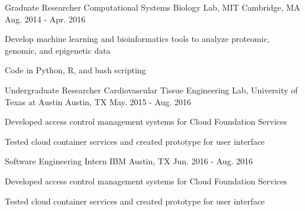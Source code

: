 

\begin{cventries}

\cventry
    {Graduate Researcher} %
    {Computational Systems Biology Lab, MIT} %
    {Cambridge, MA} %
    {Aug. 2014 - Apr. 2016} %
    {
      \begin{cvitems} %
        \item {Develop machine learning  and bioinformatics tools to analyze proteomic, genomic, and epigenetic data}
        \item {Code in Python, R, and bash scripting}
      \end{cvitems}
    }
    
 \cventry
    {Undergraduate Researcher} %
    {Cardiovascular Tissue Engineering Lab, University of Texas at Austin} %
    {Austin, TX} %
    {May. 2015 - Aug. 2016} %
    {
      \begin{cvitems} %
        \item {Developed access control management systems for Cloud Foundation Services}
        \item {Tested cloud container services and created prototype for user interface}
      \end{cvitems}
    }
    
  \cventry
    {Software Engineering Intern} %
    {IBM} %
    {Austin, TX} %
    {Jun. 2016 - Aug. 2016} %
    {
      \begin{cvitems} %
        \item {Developed access control management systems for Cloud Foundation Services}
        \item {Tested cloud container services and created prototype for user interface}
      \end{cvitems}
    }
\end{cventries}
